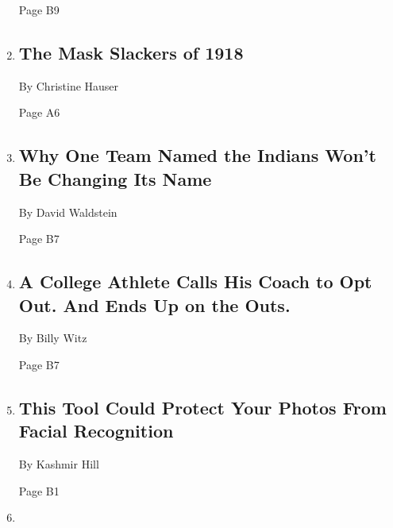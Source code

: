 \begin{enumerate}
  Page B9
\item
  \href{/2020/08/03/us/mask-protests-1918.html}{}

  \hypertarget{the-mask-slackers-of-1918}{%
  \subsection{The Mask Slackers of
  1918}\label{the-mask-slackers-of-1918}}

  By Christine Hauser

  Page A6
\item
  \href{/2020/08/03/sports/baseball/indians-team-names-mascots.html}{}

  \hypertarget{why-one-team-named-the-indians-wont-be-changing-its-name}{%
  \subsection{Why One Team Named the Indians Won't Be Changing Its
  Name}\label{why-one-team-named-the-indians-wont-be-changing-its-name}}

  By David Waldstein

  Page B7
\item
  \href{/2020/08/03/sports/coronavirus-college-athletes-opt-out.html}{}

  \hypertarget{a-college-athlete-calls-his-coach-to-opt-out-and-ends-up-on-the-outs}{%
  \subsection{A College Athlete Calls His Coach to Opt Out. And Ends Up
  on the
  Outs.}\label{a-college-athlete-calls-his-coach-to-opt-out-and-ends-up-on-the-outs}}

  By Billy Witz

  Page B7
\item
  \href{/2020/08/03/technology/fawkes-tool-protects-photos-from-facial-recognition.html}{}

  \hypertarget{this-tool-could-protect-your-photos-from-facial-recognition}{%
  \subsection{This Tool Could Protect Your Photos From Facial
  Recognition}\label{this-tool-could-protect-your-photos-from-facial-recognition}}

  By Kashmir Hill

  Page B1
\item
  \href{/2020/07/31/arts/television/muppets-now.html}{}


\end{enumerate}
